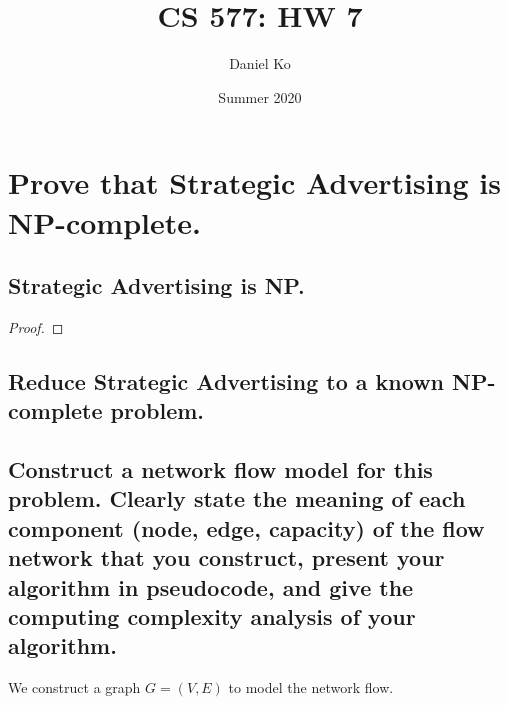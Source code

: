 \documentclass[11pt]{scrartcl}
\title{CS 577: HW 7}
\author{Daniel Ko}
\date{Summer 2020}
\begin{document}
\maketitle

\section{
	Prove that Strategic Advertising is NP-complete.
}


\subsection{
	Strategic Advertising is NP.
}

\begin{proof}
	
\end{proof}





\subsection{
	Reduce Strategic Advertising to a known NP-complete problem.
}





























\iffalse
\subsection{
	Construct a network flow model for this problem. Clearly state the
	meaning of each component (node, edge, capacity) of the flow network that you
	construct, present your algorithm in pseudocode, and give the computing complexity
	analysis of your algorithm.
}
We construct a graph $G=(V,E)$ to model the network flow.
\end{document}

